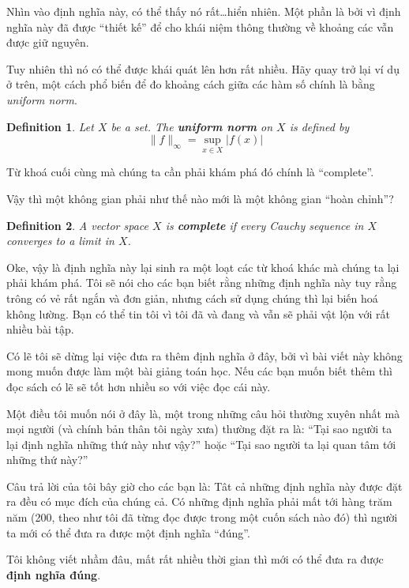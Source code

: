 \documentclass[a4paper,12pt]{article}
\newtheorem{definition}{Definition}[section]
\newenvironment{fdefinition}
  {\begin{mdframed}\begin{definition}}
  {\end{definition}\end{mdframed}}
\begin{document}
Nhìn vào định nghĩa này, có thể thấy nó rất\dots hiển nhiên. Một phần là bởi vì định
nghĩa này đã được ``thiết kế'' để cho khái niệm thông thường về khoảng các vẫn được giữ nguyên.

Tuy nhiên thì nó có thể được khái quát lên hơn rất nhiều. Hãy quay trở lại ví dụ ở trên,
một cách phổ biến để đo khoảng cách giữa các hàm số chính là bằng \emph{uniform norm}.

\begin{fdefinition}
  Let \(X\) be a set. The \textbf{uniform norm} on \(X\) is defined by
  \[
    \| f \|_{\infty} = \sup_{x \in X} |f(x)|
  \]
\end{fdefinition}

Từ khoá cuối cùng mà chúng ta cần phải khám phá đó chính là ``complete''.

Vậy thì một không gian phải như thế nào mới là một không gian ``hoàn chỉnh''?

\begin{fdefinition}
  A vector space \(X\) is \textbf{complete} if every Cauchy sequence in \(X\) converges to a limit in \(X\).
\end{fdefinition}

Oke, vậy là định nghĩa này lại sinh ra một loạt các từ khoá khác mà chúng ta lại phải khám phá.
Tôi sẽ nói cho các bạn biết rằng những định nghĩa này tuy rằng trông có vẻ rất ngắn và đơn giản,
nhưng cách sử dụng chúng thì lại biến hoá không lường. Bạn có thể tin tôi vì tôi đã và
đang và vẫn sẽ phải vật lộn với rất nhiều bài tập.

Có lẽ tôi sẽ dừng lại việc đưa ra thêm định nghĩa ở đây, bởi vì bài viết này không mong muốn được
làm một bài giảng toán học. Nếu các bạn muốn biết thêm thì đọc sách có lẽ sẽ tốt hơn nhiều
so với việc đọc cái này.

Một điều tôi muốn nói ở đây là, một trong những câu hỏi thường xuyên nhất
mà mọi người (và chính bản thân tôi ngày xưa) thường đặt ra là: ``Tại sao người ta
lại định nghĩa những thứ này như vậy?'' hoặc ``Tại sao người ta lại quan tâm tới
những thứ này?''

Câu trả lời của tôi bây giờ cho các bạn là: Tât cả những định nghĩa này được đặt ra đều có mục
đích của chúng cả. Có những định nghĩa phải mất tới hàng trăm năm (200, theo như tôi đã
từng đọc được trong một cuốn sách nào đó) thì người ta mới có thể đưa ra được
một định nghĩa ``đúng''.

Tôi không viết nhầm đâu, mất rất nhiều thời gian thì mới có thể đưa ra được \textbf{định nghĩa đúng}.
\end{document}
